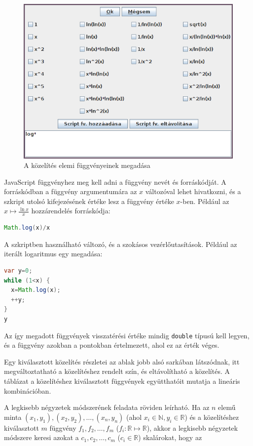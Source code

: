 \begin{figure}[H]
\caption{A közelítés elemi függvényeinek megadása}
\centering
\includegraphics[scale=0.75]{functions}
\end{figure}

JavaScript függvényhez meg kell adni a függvény nevét és forráskódját.
A forráskódban a függvény argumentumára az $x$ változóval lehet hivatkozni, és a szkript utolsó kifejezésének értéke lesz a függvény értéke $x$-ben.
Például az $x \mapsto \frac{\ln{x}}{x}$ hozzárendelés forráskódja:

\begin{lstlisting}[basicstyle=\small\ttfamily, language=Java]
Math.log(x)/x
\end{lstlisting}

A szkriptben használható változó, és a szokásos vezérlőutasítások.
Például az iterált logaritmus egy megadása:
\begin{lstlisting}[basicstyle=\small\ttfamily, language=Java, morekeywords=var]
var y=0;
while (1<x) {
  x=Math.log(x);
  ++y;
}
y
\end{lstlisting}

Az így megadott függvények visszatérési értéke mindig \texttt{double} típusú kell legyen,
és a függvény azokban a pontokban értelmezett, ahol ez az érték véges.

Egy kiválasztott közelítés részletei az ablak jobb alsó sarkában látszódnak, itt megváltoztatható a közelítéshez rendelt szín, és eltávolítható a közelítés.
A táblázat a közelítéshez kiválasztott függvények együtthatóit mutatja a lineáris kombinációban.

A legkisebb négyzetek módszerének feladata röviden leírható.
Ha az $n$ elemű minta $(x_1, y_1), (x_2, y_2), \ldots, (x_n, y_n)$ (ahol $x_i \in \mathbb{N}, y_i \in \mathbb{R}$) és a közelítéshez kiválasztott $m$ függvény $f_1, f_2, \ldots, f_m$ ($f_i:\mathbb{R} \mapsto \mathbb{R}$), akkor a legkisebb négyzetek módszere keresi azokat a $c_1, c_2, \ldots, c_m$ ($c_i \in \mathbb{R}$) skalárokat, hogy az

